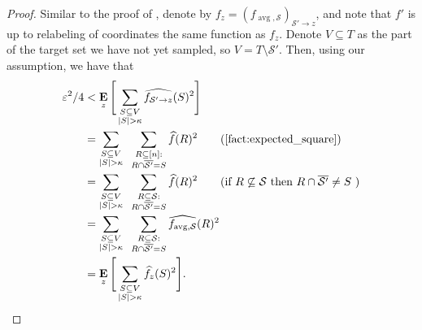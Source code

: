 \documentclass[10pt,a4paper]{article}
\theoremstyle{plain}
\theoremstyle{remark}
\theoremstyle{plain}
\providecommand{\R}{}
\renewcommand{\R}{\mathbb{R}}
\providecommand{\E}{}
\renewcommand{\E}{\mathop{\bf E\/}}
\newcommand{\eps}{\varepsilon}
\renewcommand{\hat}{\widehat}
\newcommand{\calS}{\mathcal{S}}
\newcommand{\avg}{\operatorname{avg}}
\newcommand{\InfluentialCoords}{\calS}
\newcommand{\specialset}{T}
\newcommand{\fourierCutoff}{\kappa}
\begin{document}
\begin{proof}
Similar to the proof of , denote by $f_{z} = (f_{\avg, \InfluentialCoords})_{\InfluentialCoords' \to z}$, and note that $f'$ is up to relabeling of coordinates the same function as $f_z$. Denote $V\subseteq\specialset$ as the part of the target set we have not yet sampled, so $V = \specialset\setminus \InfluentialCoords'$. Then, using our assumption, we have that 
\begin{align*}
    \eps^2/4 &<  \E_z\Bigg[\sum_{\substack{S \subseteq V \\ |S| > \fourierCutoff}} \hat{f_{\InfluentialCoords' \to z}}(S)^2\Bigg] \\
    &=\sum_{\substack{S \subseteq V \\ |S| > \fourierCutoff}}\;\;\sum_{\substack{R\subseteq [n] :\\R\cap\overline{\InfluentialCoords'} = S }}\hat{f}(R)^2 \tag{\Cref{fact:expected_square}}\\
    &= \sum_{\substack{S \subseteq V \\ |S| > \fourierCutoff}}\;\;\sum_{\substack{R\subseteq \InfluentialCoords :\\R\cap\overline{\InfluentialCoords'} = S }}\hat{f}(R)^2
    \tag{if $R\not\subseteq\InfluentialCoords$ then $R\cap\overline{\InfluentialCoords'} \neq S$ }
    \\
    &= \sum_{\substack{S \subseteq V \\ |S| > \fourierCutoff}}\;\;\sum_{\substack{R\subseteq \InfluentialCoords :\\R\cap\overline{\InfluentialCoords'} = S }}\hat{f_{\avg, \InfluentialCoords}}(R)^2
    \\
    &= \E_z\Bigg[\sum_{\substack{S \subseteq V \\ |S| > \fourierCutoff}} \hat{f_{z}}(S)^2\Bigg].
\end{align*}



\end{proof}
\end{document}
